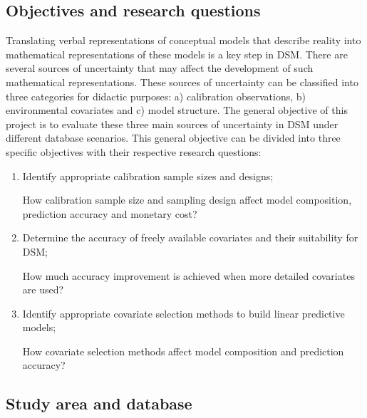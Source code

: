 \subsection{Objectives and research questions}

Translating verbal representations of conceptual models that describe reality 
into mathematical representations of these models is a key step in DSM. There 
are several sources of uncertainty that may affect the development of such 
mathematical representations. These sources of uncertainty can be classified 
into three categories for didactic purposes: a) calibration observations, b) 
environmental covariates and c) model structure. The general objective of this 
project is to evaluate these three main sources of uncertainty in DSM under 
different database scenarios. This general objective can be divided into three 
specific objectives with their respective research questions:

\begin{enumerate}
  \item Identify appropriate calibration sample sizes and designs;

   How calibration sample size and sampling 
  design affect model composition, prediction accuracy and monetary cost?

  \item Determine the accuracy of freely available covariates and their 
  suitability for DSM;

   How much accuracy improvement is achieved 
  when more detailed covariates are used?

  \item Identify appropriate covariate selection methods to build linear 
  predictive models;

   How covariate selection methods affect model 
  composition and prediction accuracy?
\end{enumerate}

\subsection{Study area and database}

